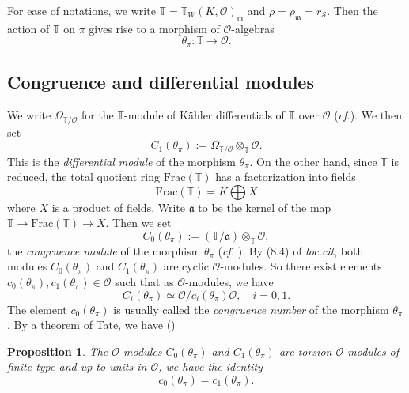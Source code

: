 \documentclass[12pt,oneside,reqno]{amsart}
\theoremstyle{plain}
\newtheorem{proposition}[theorem]{Proposition}
\begin{document}
	
	For ease of notations, we write $\mathbb{T}=\mathbb{T}_W(K,\mathcal{O})_\mathfrak{m}$ and $\rho=\rho_{\mathfrak{m}}=r_\mathcal{S}$. Then the action of $\mathbb{T}$ on $\pi$ gives rise to a morphism of $\mathcal{O}$-algebras
	\[
	\theta_\pi\colon\mathbb{T}\to\mathcal{O}.
	\]
	
	
	
	
	
	
	\subsection{Congruence and differential modules}
	
	
	
	We write $\Omega_{\mathbb{T}/\mathcal{O}}$ for the $\mathbb{T}$-module of Kähler differentials of $\mathbb{T}$ over $\mathcal{O}$ (\emph{cf.}\cite[§8.1]{HidaTilouine2020}). We then set
	\[
	C_1(\theta_\pi):=\Omega_{\mathbb{T}/\mathcal{O}}\otimes_\mathbb{T}\mathcal{O}.
	\]
	This is the \emph{differential module} of the morphism $\theta_\pi$.
	On the other hand, since $\mathbb{T}$ is reduced, the total quotient ring $\mathrm{Frac}(\mathbb{T})$ has a factorization into fields
	\[
	\mathrm{Frac}(\mathbb{T})=K\bigoplus X
	\]
	where $X$ is a product of fields. Write $\mathfrak{a}$ to be the kernel of the map $\mathbb{T}\to\mathrm{Frac}(\mathbb{T})\to X$. Then we set
	\[
	C_0(\theta_\pi)
	:=
	(\mathbb{T}/\mathfrak{a})\otimes_\mathbb{T}\mathcal{O},
	\]
	the \emph{congruence module} of the morphism $\theta_\pi$ (\emph{cf.} \cite[§8.2]{HidaTilouine2020}). By (8.4) of \emph{loc.cit}, both modules $C_0(\theta_\pi)$ and $C_1(\theta_\pi)$ are cyclic $\mathcal{O}$-modules. So there exist elements $c_0(\theta_\pi),c_1(\theta_\pi)\in\mathcal{O}$ such that as $\mathcal{O}$-modules, we have
	\[
	C_i(\theta_\pi)\simeq\mathcal{O}/c_i(\theta_\pi)\mathcal{O},
	\quad
	i=0,1.
	\]
	The element $c_0(\theta_\pi)$ is usually called the \emph{congruence number} of the morphism $\theta_\pi$.
	By a theorem of Tate, we have (\cite[Theorem 8.7]{HidaTilouine2020})
	\begin{proposition}\label{congruence ideal=differential ideal}
		The $\mathcal{O}$-modules $C_0(\theta_\pi)$ and $C_1(\theta_\pi)$ are torsion $\mathcal{O}$-modules of finite type and up to units in $\mathcal{O}$, we have the identity
		\[
		c_0(\theta_\pi)=c_1(\theta_\pi).
		\]
	\end{proposition}
	
	
	
	
\end{document}
